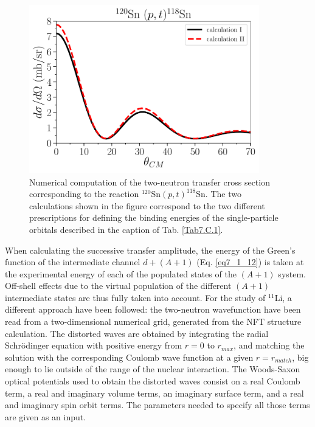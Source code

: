 \begin{subappendices}
\begin{table}
\end{table}
        \begin{figure}
	\centerline{\includegraphics*[width=10cm,angle=0]{C8/figsC8/120Sn_pt}}
	\caption{Numerical computation of the two-neutron transfer cross section corresponding to the reaction $^{120}$Sn$(p,t)^{118}$Sn. The two calculations shown in the figure correspond to the two different prescriptions for defining the binding energies of the single-particle orbitals described in the  caption of Tab. \ref{Tab7.C.1}.}\label{fig7.C.1}
\end{figure}
 When calculating the successive transfer amplitude, the energy of the Green's function of the intermediate channel $d+ (A+1)$ (Eq. \ref{eq7_1_12}) is taken at the experimental energy of each of the populated states of the $(A+1)$ system. Off-shell effects due to the virtual population of the different $(A+1)$ intermediate states are thus fully taken into account. For the study of $^{11}$Li, a different approach have been followed:  the  two-neutron wavefunction have been read from a two-dimensional numerical grid, generated from the  NFT structure calculation.
The distorted waves are obtained by integrating the radial Schr\"odinger equation with positive energy from $r=0$ to $r_{max}$, and matching the solution with the corresponding Coulomb wave function at a given $r=r_{match}$, big enough to lie outside of the range of the nuclear interaction. The  Woods-Saxon optical potentials  used to obtain the distorted waves consist on a real Coulomb term, a real and imaginary volume terms, an imaginary surface term, and a real and imaginary spin orbit terms. The parameters needed to specify all those terms are given as an input.  








\end{subappendices}
